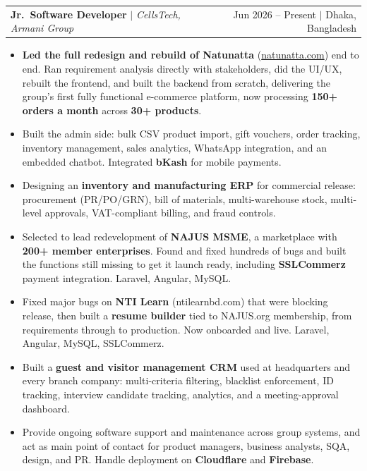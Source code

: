 \documentclass[letterpaper,10pt]{article}
\makeatletter
\newcommand{\tworow}[2]{%
  \begin{tabular*}{\textwidth}{@{}l@{\extracolsep{\fill}}r@{}}#1 & #2\end{tabular*}\par}
\newcommand{\role}[3]{%
  \needspace{4\baselineskip}%
  \tworow{\textbf{#1} {\color{midgray}$|$} \textit{#2}}{\small #3}\vspace{1pt}}
\makeatother
\begin{document}
\role{Jr.\ Software Developer}{CellsTech, Armani Group}{Jun 2026 -- Present {\color{midgray}$|$} Dhaka, Bangladesh}
\begin{itemize}
  \item \textbf{Led the full redesign and rebuild of Natunatta} (\href{https://natunatta.com}{natunatta.com}) end to end. Ran requirement analysis directly with stakeholders, did the UI/UX, rebuilt the frontend, and built the backend from scratch, delivering the group's first fully functional e-commerce platform, now processing \textbf{150+ orders a month} across \textbf{30+ products}.
  \item Built the admin side: bulk CSV product import, gift vouchers, order tracking, inventory management, sales analytics, WhatsApp integration, and an embedded chatbot. Integrated \textbf{bKash} for mobile payments.
  \item Designing an \textbf{inventory and manufacturing ERP} for commercial release: procurement (PR/PO/GRN), bill of materials, multi-warehouse stock, multi-level approvals, VAT-compliant billing, and fraud controls.
  \item Selected to lead redevelopment of \textbf{NAJUS MSME}, a marketplace with \textbf{200+ member enterprises}. Found and fixed hundreds of bugs and built the functions still missing to get it launch ready, including \textbf{SSLCommerz} payment integration. Laravel, Angular, MySQL.
  \item Fixed major bugs on \textbf{NTI Learn} (ntilearnbd.com) that were blocking release, then built a \textbf{resume builder} tied to NAJUS.org membership, from requirements through to production. Now onboarded and live. Laravel, Angular, MySQL, SSLCommerz.
  \item Built a \textbf{guest and visitor management CRM} used at headquarters and every branch company: multi-criteria filtering, blacklist enforcement, ID tracking, interview candidate tracking, analytics, and a meeting-approval dashboard.
  \item Provide ongoing software support and maintenance across group systems, and act as main point of contact for product managers, business analysts, SQA, design, and PR. Handle deployment on \textbf{Cloudflare} and \textbf{Firebase}.
\end{itemize}
\end{document}
